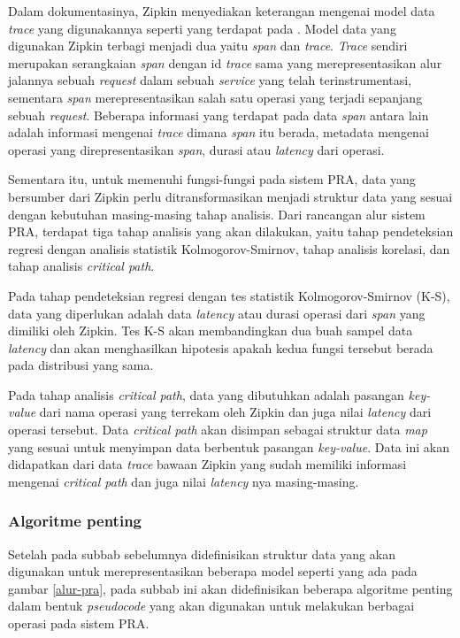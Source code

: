 Dalam dokumentasinya, Zipkin menyediakan keterangan mengenai model data \textit{trace} yang digunakannya seperti yang terdapat pada \citep{zipkin-data}. Model data yang digunakan Zipkin terbagi menjadi dua yaitu \textit{span} dan \textit{trace}. \textit{Trace} sendiri merupakan serangkaian \textit{span} dengan id \textit{trace} sama yang merepresentasikan alur jalannya sebuah \textit{request} dalam sebuah \textit{service} yang telah terinstrumentasi, sementara \textit{span} merepresentasikan salah satu operasi yang terjadi sepanjang sebuah \textit{request}. Beberapa informasi yang terdapat pada data \textit{span} antara lain adalah informasi mengenai \textit{trace} dimana \textit{span} itu berada, metadata mengenai operasi yang direpresentasikan \textit{span}, durasi atau \textit{latency} dari operasi.

Sementara itu, untuk memenuhi fungsi-fungsi pada sistem PRA, data yang bersumber dari Zipkin perlu ditransformasikan menjadi struktur data yang sesuai dengan kebutuhan masing-masing tahap analisis. Dari rancangan alur sistem PRA, terdapat tiga tahap analisis yang akan dilakukan, yaitu tahap pendeteksian regresi dengan analisis statistik Kolmogorov-Smirnov, tahap analisis korelasi, dan tahap analisis \textit{critical path}.

Pada tahap pendeteksian regresi dengan tes statistik Kolmogorov-Smirnov (K-S), data yang diperlukan adalah data \textit{latency} atau durasi operasi dari \textit{span} yang dimiliki oleh Zipkin. Tes K-S akan membandingkan dua buah sampel data \textit{latency} dan akan menghasilkan hipotesis apakah kedua fungsi tersebut berada pada distribusi yang sama.

Pada tahap analisis \textit{critical path}, data yang dibutuhkan adalah pasangan \textit{key-value} dari nama operasi yang terrekam oleh Zipkin dan juga nilai \textit{latency} dari operasi tersebut. Data \textit{critical path} akan disimpan sebagai struktur data \textit{map} yang sesuai untuk menyimpan data berbentuk pasangan \textit{key-value}. Data ini akan didapatkan dari data \textit{trace} bawaan Zipkin yang sudah memiliki informasi mengenai \textit{critical path} dan juga nilai \textit{latency} nya masing-masing. 

\subsubsection{Algoritme penting}
Setelah pada subbab sebelumnya didefinisikan struktur data yang akan digunakan untuk merepresentasikan beberapa model seperti yang ada pada gambar \ref{alur-pra}, pada subbab ini akan didefinisikan beberapa algoritme penting dalam bentuk \textit{pseudocode} yang akan digunakan untuk melakukan berbagai operasi pada sistem PRA.

